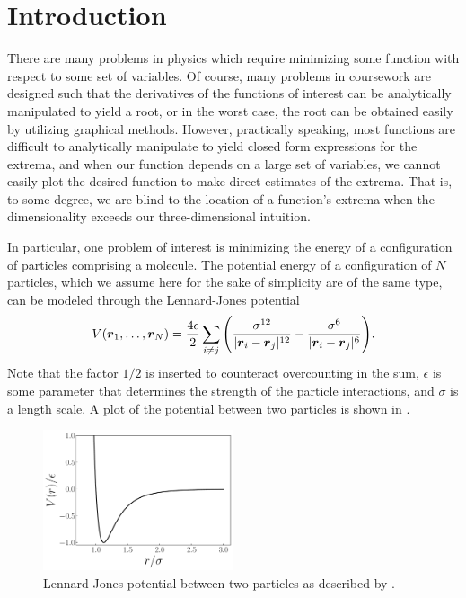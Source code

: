 
\def\HWnum{Project 1}
\def\duedate{September 25, 2024}




\section{Introduction}

There are many problems in physics which require minimizing some function with respect to some set of variables.
Of course, many problems in coursework are designed such that the derivatives of the functions of interest can be analytically manipulated to yield a root, or in the worst case, the root can be obtained easily by utilizing graphical methods.
However, practically speaking, most functions are difficult to analytically manipulate to yield closed form expressions for the extrema, and when our function depends on a large set of variables, we cannot easily plot the desired function to make direct estimates of the extrema.
That is, to some degree, we are blind to the location of a function's extrema when the dimensionality exceeds our three-dimensional intuition.

In particular, one problem of interest is minimizing the energy of a configuration of particles comprising a molecule.
The potential energy of a configuration of $N$ particles, which we assume here for the sake of simplicity are of the same type, can be modeled through the Lennard-Jones potential
\begin{align}
\label{eq:LJ-N-particle-potential}
    V(\vb*{r}_{1},\ldots,\vb*{r}_{N}) = \frac{4 \epsilon}{2} \sum_{i \ne j} \Bigg( \frac{\sigma^{12}}{|\vb*{r}_{i} - \vb*{r}_{j}|^{12}} - \frac{\sigma^{6}}{|\vb*{r}_{i} - \vb*{r}_{j}|^{6}} \Bigg)
.\end{align}
Note that the factor $1/2$ is inserted to counteract overcounting in the sum, $\epsilon$ is some parameter that determines the strength of the particle interactions, and $\sigma$ is a length scale.
A plot of the potential between two particles is shown in .


\begin{figure}[h!tb]
    \centering
    \includegraphics[width=0.5\textwidth]{1d-LJ-potential.pdf}
    \caption{Lennard-Jones potential between two particles as described by .}
    \label{fig:1d-LJ-potential}
\end{figure}


